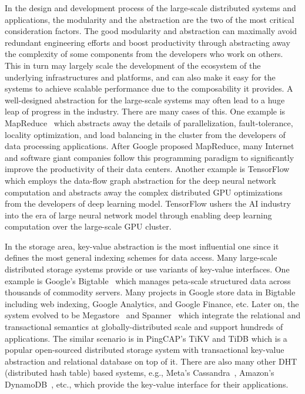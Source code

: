 In the design and development process of the large-scale distributed systems and applications, the modularity and the abstraction are the two of the most critical consideration factors. The good modularity and abstraction can maximally avoid redundant engineering efforts and boost productivity through abstracting away the complexity of some components from the developers who work on others. This in turn may largely scale the development of the ecosystem of the underlying infrastructures and platforms, and can also make it easy for the systems to achieve scalable performance due to the composability it provides. A well-designed abstraction for the large-scale systems may often lead to a huge leap of progress in the industry. There are many cases of this. One example is MapReduce~\cite{mapreduce} which abstracts away the details of parallelization, fault-tolerance, locality optimization, and load balancing in the cluster from the developers of data processing applications. After Google proposed MapReduce, many Internet and software giant companies follow this programming paradigm to significantly improve the productivity of their data centers. Another example is TensorFlow~\cite{tensorflow} which employs the data-flow graph abstraction for the deep neural network computation and abstracts away the complex distributed GPU optimizations from the developers of deep learning model. TensorFlow ushers the AI industry into the era of large neural network model through enabling deep learning computation over the large-scale GPU cluster. 

In the storage area, key-value abstraction is the most influential one since it defines the most general indexing schemes for data access. Many large-scale distributed storage systems provide or use variants of key-value interfaces. One example is Google’s Bigtable~\cite{bigtable} which manages peta-scale structured data across thousands of commodity servers. Many projects in Google store data in Bigtable including web indexing, Google Analytics, and Google Finance, etc. Later on, the system evolved to be Megastore~\cite{megastore} and Spanner~\cite{spanner} which integrate the relational and transactional semantics at globally-distributed scale and support hundreds of applications. The similar scenario is in PingCAP’s TiKV and TiDB which is a popular open-sourced distributed storage system with transactional key-value abstraction and relational database on top of it. There are also many other DHT (distributed hash table) based systems, e.g., Meta’s Cassandra~\cite{cassandra}, Amazon’s DynamoDB~\cite{dynamodb}, etc., which provide the key-value interface for their applications. 


